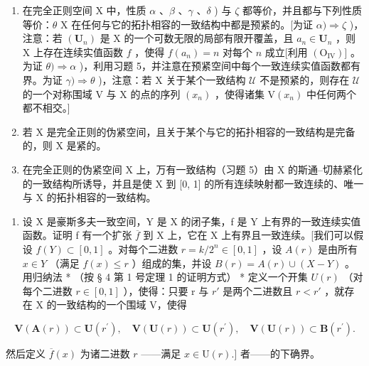 \begin{enumerate}
\def\labelenumi{\alph{enumi})}
\setcounter{enumi}{3}
\item
  在完全正则空间 X 中，性质 \(\alpha\) 、\(\beta\) 、\(\gamma\) 、\(\delta\) ) 与 \(\zeta\) 都等价，并且都与下列性质等价：\(\theta\) X 在任何与它的拓扑相容的一致结构中都是预紧的。{[}为证 \(\alpha) \Longrightarrow \zeta\) )，注意：若 \((\mathbf{U}_n)\) 是 X 的一个可数无限的局部有限开覆盖，且 \(a_n \in \mathbf{U}_n\) ，则 X 上存在连续实值函数 \(f\) ，使得 \(f(a_n) = n\) 对每个 \(n\) 成立{[}利用 \((\mathrm{O}_{\mathrm{IV}})]\) 。为证 \(\theta) \Longrightarrow \alpha\) )，利用习题 5，并注意在预紧空间中每个一致连续实值函数都有界。为证 \(\gamma) \Longrightarrow \theta\) )，注意：若 X 关于某个一致结构 \(\mathcal{U}\) 不是预紧的，则存在 \(\mathcal{U}\) 的一个对称围域 V 与 X 的点的序列 \((x_n)\) ，使得诸集 \(\mathrm{V}(x_n)\) 中任何两个都不相交。{]}
\item
  若 X 是完全正则的伪紧空间，且关于某个与它的拓扑相容的一致结构是完备的，则 X 是紧的。
\item
  在完全正则的伪紧空间 X 上，万有一致结构（习题 5）由 X 的斯通–切赫紧化的一致结构所诱导，并且是使 X 到 {[}0, 1{]} 的所有连续映射都一致连续的、唯一与 X 的拓扑相容的一致结构。
\end{enumerate}

\begin{enumerate}
\def\labelenumi{\arabic{enumi})}
\setcounter{enumi}{21}
\tightlist
\item
  设 X 是豪斯多夫一致空间，Y 是 X 的闭子集，f 是 Y 上有界的一致连续实值函数。证明 f 有一个扩张 \(\overline{f}\) 到 X 上，它在 X 上有界且一致连续。{[}我们可以假设 \(f(Y) \subset [0, 1]\) 。对每个二进数 \(r = k/2^{n} \in [0, 1]\) ，设 \(A(r)\) 是由所有 \(x \in Y\) （满足 \(f(x) \leqslant r\) ）组成的集，并设 \(B(r) = A(r) \cup (X - Y)\) 。用归纳法 * （按 § 4 第 1 号定理 1 的证明方式） * 定义一个开集 \(U(r)\) （对每个二进数 \(r \in [0, 1]\) ），使得：只要 r 与 \(r'\) 是两个二进数且 \(r < r'\) ，就存在 X 的一致结构的一个围域 V，使得
\end{enumerate}

\[
\mathbf {V} (\mathbf {A} (r)) \subset \mathbf {U} (r ^ {\prime}), \quad \mathbf {V} (\mathbf {U} (r)) \subset \mathbf {U} (r ^ {\prime}), \quad \mathbf {V} (\mathbf {U} (r)) \subset \mathbf {B} (r ^ {\prime}).
\]

然后定义 \(\overline{f}(x)\) 为诸二进数 \(r\) ——满足 \(x \in \mathrm{U}(r).]\) 者——的下确界。

